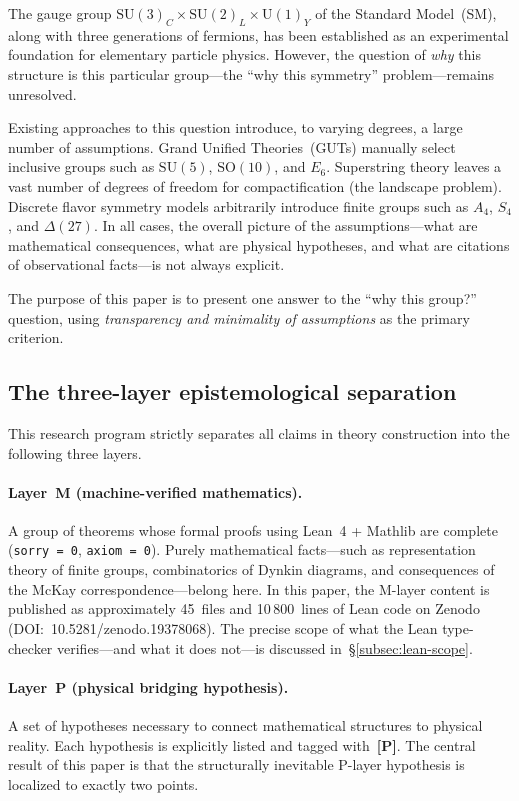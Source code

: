 \documentclass[sn-mathphys-num,Numbered]{sn-jnl}
\theoremstyle{thmstyleone}
\theoremstyle{thmstylethree}
\newcommand{\SU}{\mathrm{SU}}
\newcommand{\SO}{\mathrm{SO}}
\newcommand{\U}{\mathrm{U}}
\newcommand{\layerP}{\textbf{[P]}}
\begin{document}
The gauge group $\SU(3)_C \times \SU(2)_L \times \U(1)_Y$ of the Standard
Model~(SM), along with three generations of fermions, has been established as
an experimental foundation for elementary particle physics.  However, the
question of \emph{why} this structure is this particular group---the ``why this
symmetry'' problem---remains unresolved.

Existing approaches to this question introduce, to varying degrees, a large
number of assumptions.  Grand Unified Theories~(GUTs) manually select
inclusive groups such as $\SU(5)$, $\SO(10)$, and $E_6$.  Superstring theory
leaves a vast number of degrees of freedom for compactification (the landscape
problem).  Discrete flavor symmetry models arbitrarily introduce finite groups
such as $A_4$, $S_4$, and $\Delta(27)$.  In all cases, the overall picture of
the assumptions---what are mathematical consequences, what are physical
hypotheses, and what are citations of observational facts---is not always
explicit.

The purpose of this paper is to present one answer to the ``why this group?''
question, using \emph{transparency and minimality of assumptions} as the
primary criterion.


\subsection{The three-layer epistemological separation}\label{sec:layers}

This research program strictly separates all claims in theory construction into
the following three layers.

\paragraph{Layer~M (machine-verified mathematics).}
A group of theorems whose formal proofs using Lean~4 + Mathlib are complete
(\texttt{sorry\,=\,0}, \texttt{axiom\,=\,0}).  Purely mathematical facts---such
as representation theory of finite groups, combinatorics of Dynkin diagrams,
and consequences of the McKay correspondence---belong here.  In this paper,
the M-layer content is published as approximately
45~files and 10\,800~lines of Lean code on Zenodo
(DOI:~10.5281/zenodo.19378068).
The precise scope of what the Lean type-checker verifies---and what it
does not---is discussed in~\S\ref{subsec:lean-scope}.

\paragraph{Layer~P (physical bridging hypothesis).}
A set of hypotheses necessary to connect mathematical structures to physical
reality.  Each hypothesis is explicitly listed and tagged with~\layerP.  The
central result of this paper is that the structurally inevitable P-layer
hypothesis is localized to exactly two points.
\end{document}
